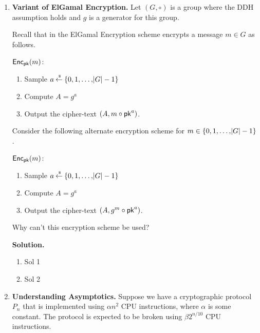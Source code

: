 \documentclass[11pt]{article}
\newcommand{\nextoddpage}{\checkoddpage\ifoddpage{\ \newpage\ \newpage}\else{\ \newpage}\fi}
\begin{document}
\begin{enumerate}
  {\bfseries Solution.} 
  \begin{enumerate}
  \item Sol 1
  \item Sol 2 
  \end{enumerate} 
  
  
\nextoddpage 
\item {\bfseries Variant of ElGamal Encryption.} 
  Let $(G,\circ)$ is a group where the DDH assumption holds and $g$ is a generator for this group. 
  
  Recall that in the ElGamal Encryption scheme encrypts a message $m\in G$ as follows.
  \begin{boxedalgo}
  $\mathsf{Enc}_\mathsf{pk}(m)$:
  \begin{enumerate}
  \item Sample $a\mathbin{\stackrel{\mbox{\,\tiny \$}}{\gets}}\{0,1,\dots,\abs G-1\}$ 
  \item Compute $A = g^a$ 
  \item Output the cipher-text $(A, m\circ \mathsf{pk}^a)$. 
  \end{enumerate} 
  \end{boxedalgo} 
  
  Consider the following alternate encryption scheme for $m\in\{0,1,\dotsc,\abs G-1\}$.
  \begin{boxedalgo}
  $\mathsf{Enc}_\mathsf{pk}(m)$:
  \begin{enumerate}
  \item Sample $a\mathbin{\stackrel{\mbox{\,\tiny \$}}{\gets}}\{0,1,\dots,\abs G-1\}$ 
  \item Compute $A = g^a$ 
  \item Output the cipher-text $(A, g^m\circ \mathsf{pk}^a)$. 
  \end{enumerate} 
  \end{boxedalgo} 
  
  Why can't this encryption scheme be used? 
  
  {\bfseries Solution.} 
  \begin{enumerate}
  \item Sol 1
  \item Sol 2 
  \end{enumerate}
  
  
  
   

\nextoddpage 
\item {\bfseries Understanding Asymptotics.} 
  Suppose we have a cryptographic protocol $P_n$ that is implemented using $\alpha n^2$ CPU instructions, where $\alpha$ is some constant.  
  The protocol is expected to be broken using $\beta 2^{n/10}$ CPU instructions. 
  

\end{enumerate}
\end{document}
